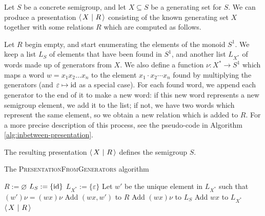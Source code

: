 \begin{method}
  \label{meth:inbetween-presentation}
  Let $S$ be a concrete semigroup, and let $X \subseteq S$ be a generating set
  for $S$.  We can produce a presentation $\left\langle\,X ~\middle|~ R\,\right\rangle$ consisting of the known
  generating set $X$ together with some relations $R$ which are computed as
  follows.

  Let $R$ begin empty, and start enumerating the elements of the monoid $S^1$.
  We keep a list $L_S$ of elements that have been found in $S^1$, and another
  list $L_{X^*}$ of words made up of generators from $X$.  We also define a
  function $\nu : X^* \to S^1$ which maps a word $w=x_1x_2\ldots x_n$ to the
  element $x_1\cdot x_2\cdots x_n$ found by multiplying the generators (and
  $\varepsilon \mapsto \operatorname{id}$ as a special case).  For each found word, we append
  each generator to the end of it to make a new word: if this new word
  represents a new semigroup element, we add it to the list; if not, we have two
  words which represent the same element, so we obtain a new relation which is
  added to $R$.  For a more precise description of this process, see the
  pseudo-code in Algorithm \ref{alg:inbetween-presentation}.

  The resulting presentation $\left\langle\,X ~\middle|~ R\,\right\rangle$ defines the semigroup $S$.
\end{method}

\begin{algorithm}
\caption{The \textsc{PresentationFromGenerators} algorithm}
\label{alg:inbetween-presentation}
  \begin{algorithmic}
      \State $R := \varnothing$
      \State $L_S := \{\operatorname{id}\}$
      \State $L_{X^*} := \{\varepsilon\}$
          \State Let $w'$ be the unique element in $L_{X^*}$ such that $(w')\nu = (wx)\nu$
            \State Add $(wx, w')$ to $R$
          \Else
            \State Add $(wx)\nu$ to $L_S$
            \State Add $wx$ to $L_{X^*}$
          \EndIf
        \EndFor
      \EndFor
      \State \Return $\left\langle\,X ~\middle|~ R\,\right\rangle$
    \EndProcedure
  \end{algorithmic}
\end{algorithm}

